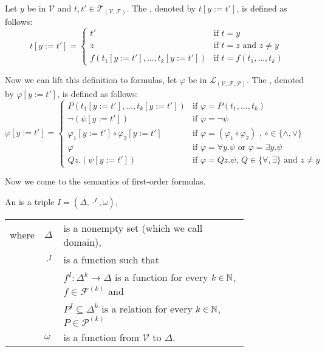 \begin{definition}
	Let $y$ be in $\mathcal{V}$ and $t,t'\in\mathcal{T}_{(\mathcal{V},\mathcal{F})}$. The , denoted by $t\left[y:=t'\right]$, is defined as follows:
	\[t\left[y:=t'\right]=
		\begin{cases}
			t'                                                   & \text{if $t=y$}                \\ 
			z                                                    & \text{if $t=z$ and $z\neq y$}  \\%
			f(t_1\left[y:=t'\right],\dots,t_k\left[y:=t'\right]) & \text{if $t=f(t_1,\dots,t_k)$} 
		\end{cases}\]
	
	Now we can lift this definition to formulas, let $\varphi$ be in $\mathcal{L}_{(\mathcal{V},\mathcal{F},\mathcal{P})}$. The , denoted by $\varphi\left[y:=t'\right]$, is defined as follows:
	\[\varphi\left[y:=t'\right]=
		\begin{cases}
			P(t_1\left[y:=t'\right],\dots,t_k\left[y:=t'\right])        & \text{if $\varphi=P(t_1,\dots,t_k)$}                                     \\
			\neg(\psi\left[y:=t'\right])                                      & \text{if $\varphi=\neg\psi$}                                             \\ %
			\varphi_1\left[y:=t'\right]\circ\varphi_2\left[y:=t'\right] & \text{if $\varphi=(\varphi_1\circ\varphi_2)$ , $\circ\in\{\wedge,\vee\}$} \\
			\varphi                                                     & \text{if $\varphi=\forall y.\psi$ or $\varphi=\exists y.\psi$}                   \\
			Q z.(\psi\left[y:=t'\right])                                 & \text{if $\varphi=Q z.\psi$, $Q\in\{\forall,\exists\}$ and $z\neq y$}     
		\end{cases}\]

\end{definition}
Now we come to the semantics of first-order formulas.
\begin{definition}
	An  is a triple $I=(\Delta,\cdot^I,\omega)$,
	\begin{tabular}{llp{0.78\linewidth}}
		where & $\Delta$  & is a nonempty set (which we call  domain),                                                     \\
& $\cdot^I$ & is a function such that                                                                        \\
&           & $f^I\colon\Delta^k\to\Delta$  is a function for every $k\in\mathbb{N}$, $f\in\mathcal{F}^{(k)}$ and \\
&           & $P^I\subseteq\Delta^k$ is a relation for every $k\in\mathbb{N}$, $P\in\mathcal{P}^{(k)}$       \\
& $\omega$  & is a function from $\mathcal{V}$ to $\Delta$.                                                  
	\end{tabular}
\end{definition}
